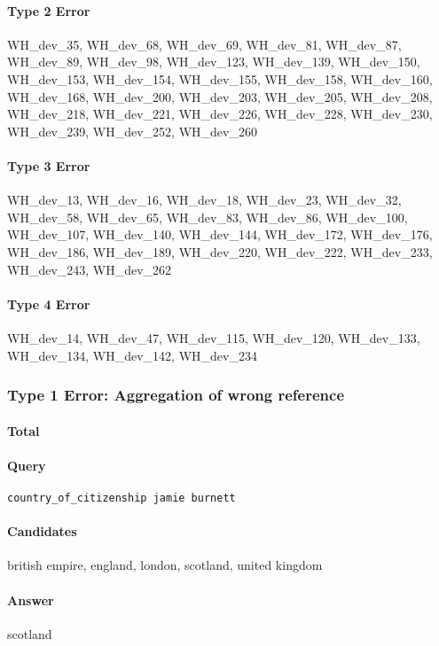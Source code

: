 \documentclass{article} \usepackage{iclr2019_conference,times}
\begin{document}
\paragraph{Type 2 Error}
WH\_dev\_35, WH\_dev\_68, WH\_dev\_69, WH\_dev\_81, WH\_dev\_87, WH\_dev\_89, WH\_dev\_98, WH\_dev\_123, WH\_dev\_139, WH\_dev\_150, WH\_dev\_153, WH\_dev\_154, WH\_dev\_155, WH\_dev\_158, WH\_dev\_160, WH\_dev\_168, WH\_dev\_200, WH\_dev\_203, WH\_dev\_205, WH\_dev\_208, WH\_dev\_218, WH\_dev\_221, WH\_dev\_226, WH\_dev\_228, WH\_dev\_230, WH\_dev\_239, WH\_dev\_252, WH\_dev\_260

\paragraph{Type 3 Error}
WH\_dev\_13, WH\_dev\_16, WH\_dev\_18, WH\_dev\_23, WH\_dev\_32, WH\_dev\_58, WH\_dev\_65, WH\_dev\_83, WH\_dev\_86, WH\_dev\_100, WH\_dev\_107, WH\_dev\_140, WH\_dev\_144, WH\_dev\_172, WH\_dev\_176, WH\_dev\_186, WH\_dev\_189, WH\_dev\_220, WH\_dev\_222, WH\_dev\_233, WH\_dev\_243, WH\_dev\_262

\paragraph{Type 4 Error}
WH\_dev\_14, WH\_dev\_47, WH\_dev\_115, WH\_dev\_120, WH\_dev\_133, WH\_dev\_134, WH\_dev\_142, WH\_dev\_234



\subsubsection{Type 1 Error: Aggregation of wrong reference}

\paragraph{Total} 

\paragraph{Query}
\texttt{country\_of\_citizenship jamie burnett}

\paragraph{Candidates}
british empire, england, london, scotland, united kingdom

\paragraph{Answer}
scotland
\end{document}
